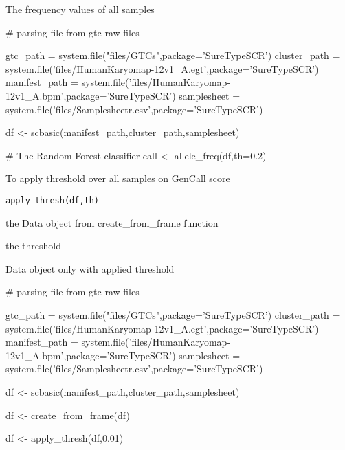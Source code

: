 \documentclass[a4paper]{book}
\begin{document}
%
\begin{Value}
The frequency values of all samples
\end{Value}
%
\begin{Examples}
\begin{ExampleCode}

# parsing file from gtc raw files

gtc_path = system.file("files/GTCs",package='SureTypeSCR')
cluster_path = system.file('files/HumanKaryomap-12v1_A.egt',package='SureTypeSCR')
manifest_path = system.file('files/HumanKaryomap-12v1_A.bpm',package='SureTypeSCR')
samplesheet = system.file('files/Samplesheetr.csv',package='SureTypeSCR')

df <- scbasic(manifest_path,cluster_path,samplesheet)

# The Random Forest classifier
call <- allele_freq(df,th=0.2) 




\end{ExampleCode}
\end{Examples}
%
\begin{Description}\relax
To apply threshold over all samples on GenCall score
\end{Description}
%
\begin{Usage}
\begin{verbatim}
apply_thresh(df,th)
\end{verbatim}
\end{Usage}
%
\begin{Arguments}
\begin{ldescription}
\item[\code{df}] the Data object from create\_from\_frame function
\item[\code{th}] the threshold
\end{ldescription}
\end{Arguments}
%
\begin{Value}
Data object only with applied threshold
\end{Value}
%
\begin{Examples}
\begin{ExampleCode}

# parsing file from gtc raw files

gtc_path = system.file("files/GTCs",package='SureTypeSCR')
cluster_path = system.file('files/HumanKaryomap-12v1_A.egt',package='SureTypeSCR')
manifest_path = system.file('files/HumanKaryomap-12v1_A.bpm',package='SureTypeSCR')
samplesheet = system.file('files/Samplesheetr.csv',package='SureTypeSCR')

df <- scbasic(manifest_path,cluster_path,samplesheet)

df <- create_from_frame(df)

df <- apply_thresh(df,0.01)




\end{ExampleCode}
\end{Examples}
\end{document}
